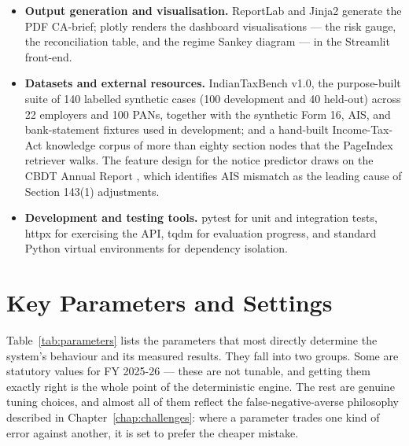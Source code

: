 \documentclass[12pt, a4paper, oneside]{report}
\begin{document}
\begin{itemize}
          Form 16 PDFs. A dedicated description normaliser strips transfer codes,
          UTR references, and transaction IDs before classification.
    \item \textbf{Output generation and visualisation.} ReportLab and Jinja2
          generate the PDF CA-brief; plotly renders the dashboard visualisations
          --- the risk gauge, the reconciliation table, and the regime Sankey
          diagram --- in the Streamlit front-end.
    \item \textbf{Datasets and external resources.} IndianTaxBench v1.0, the
          purpose-built suite of 140 labelled synthetic cases (100 development
          and 40 held-out) across 22 employers and 100 PANs, together with the
          synthetic Form 16, AIS, and bank-statement fixtures used in
          development; and a hand-built Income-Tax-Act knowledge corpus of more
          than eighty section nodes that the PageIndex retriever walks. The
          feature design for the notice predictor draws on the CBDT Annual Report
          \cite{ref12}, which identifies AIS mismatch as the leading cause of
          Section 143(1) adjustments.
    \item \textbf{Development and testing tools.} pytest for unit and integration
          tests, httpx for exercising the API, tqdm for evaluation progress, and
          standard Python virtual environments for dependency isolation.
\end{itemize}

\section{Key Parameters and Settings}
\label{sec:parameters}

Table~\ref{tab:parameters} lists the parameters that most directly determine the
system's behaviour and its measured results. They fall into two groups. Some are
statutory values for FY 2025-26 --- these are not tunable, and getting them
exactly right is the whole point of the deterministic engine. The rest are
genuine tuning choices, and almost all of them reflect the false-negative-averse
philosophy described in Chapter~\ref{chap:challenges}: where a parameter trades
one kind of error against another, it is set to prefer the cheaper mistake.
\end{document}
